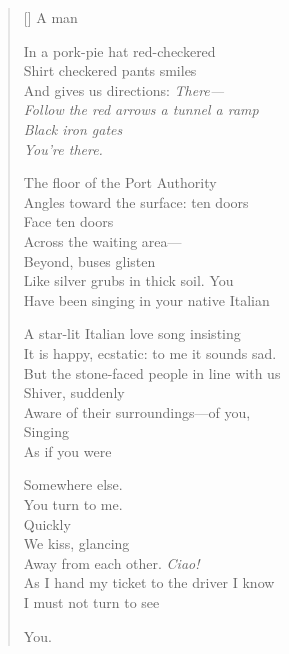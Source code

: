 \label{ch:orpheus}
\settowidth{\versewidth}{Follow the red arrows \qquad a tunnel \qquad a ramp}
\begin{verse}[\versewidth]
\hspace*{4\vgap} A man

In a pork-pie hat \qquad red-checkered\\
Shirt \qquad checkered pants \qquad smiles\\
And gives us directions: \qquad \textit{There---\\
Follow the red arrows \qquad a tunnel \qquad a ramp\\
Black iron gates\\
You're there.}

The floor of the Port Authority\\
Angles toward the surface: ten doors\\
Face ten doors\\
Across the waiting area---\\
Beyond, buses glisten\\
Like silver grubs in thick soil. \qquad You\\
Have been singing in your native Italian

A star-lit Italian love song insisting\\
It is happy, ecstatic: to me it sounds sad.\\
But the stone-faced people in line with us\\
Shiver, suddenly\\
Aware of their surroundings---of you,\\
Singing\\
As if you were

Somewhere else.\\
You turn to me.\\
Quickly\\
We kiss, glancing\\
Away from each other. \qquad \textit{Ciao!}\\
As I hand my ticket to the driver I know\\
I must not turn to see

You.
\end{verse}
